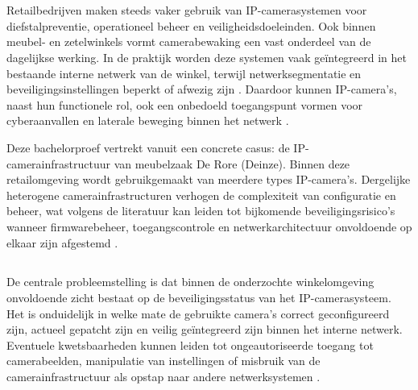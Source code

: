 
\chapter{}%
\label{ch:inleiding}

Retailbedrijven maken steeds vaker gebruik van IP-camerasystemen voor diefstalpreventie, operationeel beheer en veiligheidsdoeleinden. Ook binnen meubel- en zetelwinkels vormt camerabewaking een vast onderdeel van de dagelijkse werking. In de praktijk worden deze systemen vaak geïntegreerd in het bestaande interne netwerk van de winkel, terwijl netwerksegmentatie en beveiligingsinstellingen beperkt of afwezig zijn \parencite{agarwal2019detecting}. Daardoor kunnen IP-camera’s, naast hun functionele rol, ook een onbedoeld toegangspunt vormen voor cyberaanvallen en laterale beweging binnen het netwerk \parencite{ENISA2024ThreatLandscape}.

Deze bachelorproef vertrekt vanuit een concrete casus: de IP-camerainfrastructuur van meubelzaak De Rore (Deinze). Binnen deze retailomgeving wordt gebruikgemaakt van meerdere types IP-camera’s. Dergelijke heterogene camerainfrastructuren verhogen de complexiteit van configuratie en beheer, wat volgens de literatuur kan leiden tot bijkomende beveiligingsrisico’s wanneer firmwarebeheer, toegangscontrole en netwerkarchitectuur onvoldoende op elkaar zijn afgestemd \parencite{Butun2019arXivIoTSecurity}.

\section{}%
\label{sec:probleemstelling}

De centrale probleemstelling is dat binnen de onderzochte winkelomgeving onvoldoende zicht bestaat op de beveiligingsstatus van het IP-camerasysteem. Het is onduidelijk in welke mate de gebruikte camera’s correct geconfigureerd zijn, actueel gepatcht zijn en veilig geïntegreerd zijn binnen het interne netwerk. Eventuele kwetsbaarheden kunnen leiden tot ongeautoriseerde toegang tot camerabeelden, manipulatie van instellingen of misbruik van de camerainfrastructuur als opstap naar andere netwerksystemen \parencite{Butun2019arXivIoTSecurity}.

